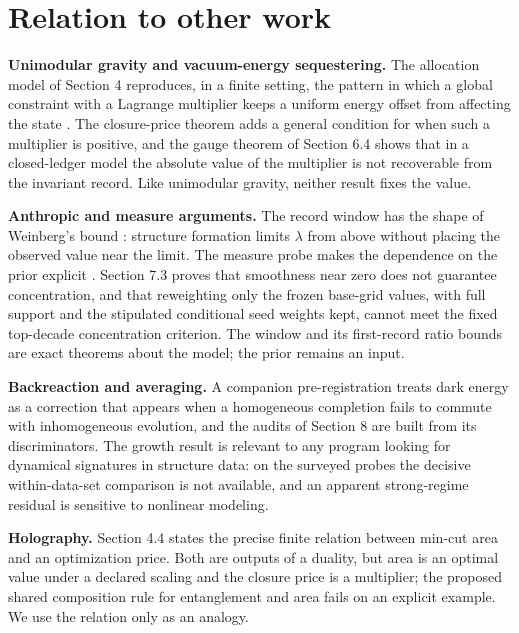 \hypertarget{relation-to-other-work}{%
\section{Relation to other work}\label{relation-to-other-work}}

\textbf{Unimodular gravity and vacuum-energy sequestering.} The
allocation model of Section 4 reproduces, in a finite setting, the
pattern in which a global constraint with a Lagrange multiplier keeps a
uniform energy offset from affecting the state
\citep{HenneauxTeitelboim1989, KaloperPadilla2014}. The closure-price
theorem adds a general condition for when such a multiplier is positive,
and the gauge theorem of Section 6.4 shows that in a closed-ledger model
the absolute value of the multiplier is not recoverable from the
invariant record. Like unimodular gravity, neither result fixes the
value.

\textbf{Anthropic and measure arguments.} The record window has the
shape of Weinberg's bound \citep{Weinberg1987}: structure formation
limits \(\lambda\) from above without placing the observed value near
the limit. The measure probe makes the dependence on the prior explicit
\citep{MartelShapiroWeinberg1998, BoussoPolchinski2000}. Section 7.3
proves that smoothness near zero does not guarantee concentration, and
that reweighting only the frozen base-grid values, with full support and
the stipulated conditional seed weights kept, cannot meet the fixed
top-decade concentration criterion. The window and its first-record
ratio bounds are exact theorems about the model; the prior remains an
input.

\textbf{Backreaction and averaging.} A companion pre-registration
\citep{TsiokosDarkEnergy2026} treats dark energy as a correction that
appears when a homogeneous completion fails to commute with
inhomogeneous evolution, and the audits of Section 8 are built from its
discriminators. The growth result is relevant to any program looking for
dynamical signatures in structure data: on the surveyed probes the
decisive within-data-set comparison is not available, and an apparent
strong-regime residual is sensitive to nonlinear modeling.

\textbf{Holography.} Section 4.4 states the precise finite relation
between min-cut area and an optimization price. Both are outputs of a
duality, but area is an optimal value under a declared scaling and the
closure price is a multiplier; the proposed shared composition rule for
entanglement and area fails on an explicit example. We use the relation
only as an analogy.

